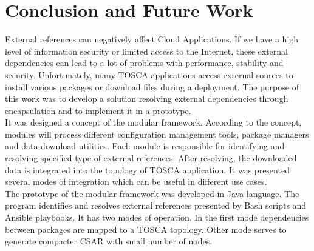 
\chapter{Conclusion and Future Work}\label{chap:zusfas}
External references can negatively affect  Cloud Applications.
If we have a high level of information security or limited access to the Internet, these external dependencies can lead to a lot of problems with performance, stability and security.
Unfortunately, many TOSCA applications access external sources to install various packages or download files during a deployment.
The purpose of this work was to develop a solution resolving external dependencies through encapsulation and to implement it in a prototype.\\
It was designed a concept of the modular framework. 
According to the concept, modules will process different configuration management tools, package managers and data download utilities. 
Each module is responsible for identifying and resolving specified type of external references. 
After resolving, the downloaded data is integrated into the topology of TOSCA application.
It was presented several modes of integration which can be useful in different use cases.\\
The prototype of the modular framework was developed in Java language.
The program identifies and resolves external references presented by Bash scripts and Ansible playbooks.
It has two modes of operation.
In the first mode dependencies between packages are mapped to a TOSCA topology. 
Other mode serves to generate compacter CSAR with small number of nodes. %
